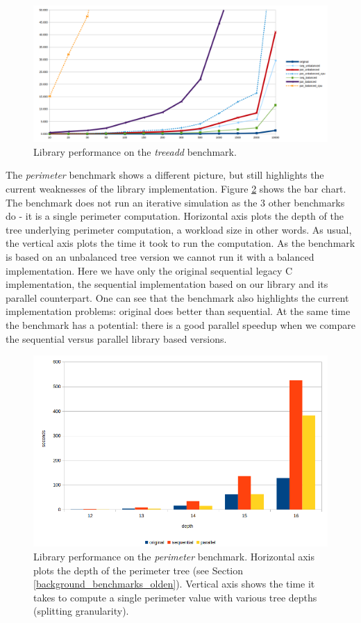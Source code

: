\begin{figure}[!htb]
\includegraphics[width=1.0\textwidth]{images/treeadd_depth_16.png}
\caption{Library performance on the \textit{treeadd} benchmark.}
\label{fig:performance_treeadd}
\end{figure}\newline\null
\quad The \textit{perimeter} benchmark shows a different picture, but still highlights the current weaknesses of the library implementation. Figure \ref{fig:performance_perimeter} shows the bar chart. The benchmark does not run an iterative simulation as the 3 other benchmarks do - it is a single perimeter computation. Horizontal axis plots the depth of the tree underlying perimeter computation, a workload size in other words. As usual, the vertical axis plots the time it took to run the computation. As the benchmark is based on an unbalanced tree version we cannot run it with a balanced implementation. Here we have only the original sequential legacy C implementation, the sequential implementation based on our library and its parallel counterpart. One can see that the benchmark also highlights the current implementation problems: original does better than sequential. At the same time the benchmark has a potential: there is a good parallel speedup when we compare the sequential versus parallel library based versions.
\begin{figure}[!htb]
\includegraphics[width=1.0\textwidth]{images/perimeter.png}
\caption{Library performance on the \textit{perimeter} benchmark. Horizontal axis plots the depth of the perimeter tree (see Section \ref{background_benchmarks_olden}). Vertical axis shows the time it takes to compute a single perimeter value with various tree depths (splitting granularity).}
\label{fig:performance_perimeter}
\end{figure}


